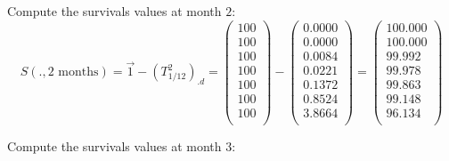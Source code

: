 \documentclass[a4paper,12pt,final]{article}
\begin{document}
Compute the survivals values at month $2$:
\begin{displaymath}
S(.,2 \textrm{ months}) = \vec{1} - (T_{1/12}^2)_{.d} = 
\left( 
\begin{array}{c}
 100 \\
 100 \\
 100 \\
 100 \\
 100 \\
 100 \\
 100 \\
\end{array}
\right)
 - 
\left( 
\begin{array}{c}
 0.0000 \\
 0.0000 \\
 0.0084 \\
 0.0221 \\
 0.1372 \\
 0.8524 \\
 3.8664 \\
\end{array}
\right)
=
\left( 
\begin{array}{c}
 100.000 \\
 100.000 \\
  99.992 \\
  99.978 \\
  99.863 \\
  99.148 \\
  96.134 \\
\end{array}
\right)
\end{displaymath}

Compute the survivals values at month $3$:
\end{document}
